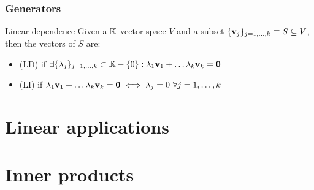 \subsubsection{Generators}

\begin{definition}{Linear dependence}{}
  Given a $ \mathbb{K} $-vector space $ V $ and a subset $ \{\mathbf{v}_j\}_{j = 1, \dots, k} \equiv S \subseteq V $, then the vectors of $ S $ are:
  \begin{itemize}
    \item {} (LD) if $ \exists \{\lambda_j\}_{j = 1, \dots, k} \subset \mathbb{K} - \{0\} : \lambda_1 \mathbf{v}_1 + \dots \lambda_k \mathbf{v}_k = \mathbf{0} $
    \item {} (LI) if $ \lambda_1 \mathbf{v}_1 + \dots \lambda_k \mathbf{v}_k = \mathbf{0} \iff \lambda_j = 0 \,\,\forall j = 1, \dots, k $
  \end{itemize}
\end{definition}







\section{Linear applications}

\section{Inner products}
